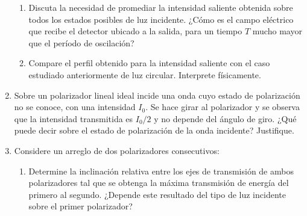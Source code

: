 \documentclass[11pt,spanish]{article}
\begin{document}
\begin{enumerate}
\begin{enumerate}
        \item Discuta la necesidad de promediar la intensidad saliente obtenida
        sobre todos los estados posibles de luz incidente. ¿Cómo es el campo
        eléctrico que recibe el detector ubicado a la salida, para un tiempo $T$
        mucho mayor que el período de oscilación?
        
        \item Compare el perfil obtenido para la intensidad saliente con el caso
        estudiado anteriormente de luz circular. Interprete físicamente.
    \end{enumerate}

    

    
    
    \item Sobre un polarizador lineal ideal incide una onda cuyo estado de
    polarización no se conoce, con una intensidad $I_{0}$. Se hace girar
    al polarizador y se observa que la intensidad transmitida es $I_{0}/2$
    y no depende del ángulo de giro. ¿Qué puede decir sobre el estado
    de polarización de la onda incidente? Justifique.


    \item Considere un arreglo de dos polarizadores consecutivos:

    \begin{enumerate}
        \item Determine la inclinación relativa entre los ejes de transmisión de
        ambos polarizadores tal que se obtenga la máxima transmisión de energía
        del primero al segundo. ¿Depende este resultado del tipo de luz
        incidente sobre el primer polarizador?
        

\end{enumerate}
\end{enumerate}
\end{document}
